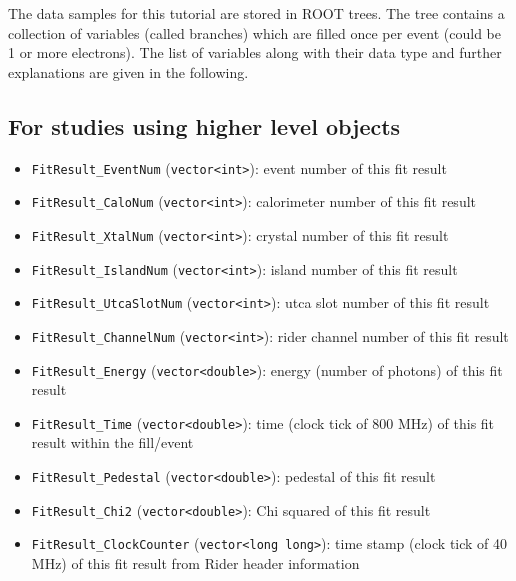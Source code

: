 The data samples for this tutorial are stored in ROOT trees. The tree contains a collection of variables (called branches) which are filled once per event (could be 1 or more electrons). The list of variables along with their data type and further explanations are given in the following.

\subsection*{For studies using higher level objects}

\begin{itemize}

\item \verb+FitResult_EventNum+ (\verb+vector<int>+): event number of this fit result
\item \verb+FitResult_CaloNum+ (\verb+vector<int>+): calorimeter number of this fit result
\item \verb+FitResult_XtalNum+ (\verb+vector<int>+): crystal number of this fit result
\item \verb+FitResult_IslandNum+ (\verb+vector<int>+): island number of this fit result
\item \verb+FitResult_UtcaSlotNum+ (\verb+vector<int>+): utca slot number of this fit result
\item \verb+FitResult_ChannelNum+ (\verb+vector<int>+): rider channel number of this fit result
\item \verb+FitResult_Energy+ (\verb+vector<double>+): energy (number of photons) of this fit result
\item \verb+FitResult_Time+ (\verb+vector<double>+): time (clock tick of 800 MHz) of this fit result within the fill/event
\item \verb+FitResult_Pedestal+ (\verb+vector<double>+): pedestal of this fit result
\item \verb+FitResult_Chi2+ (\verb+vector<double>+): Chi squared of this fit result
\item \verb+FitResult_ClockCounter+ (\verb+vector<long long>+): time stamp (clock tick of 40 MHz) of this fit result from Rider header information


\end{itemize}
